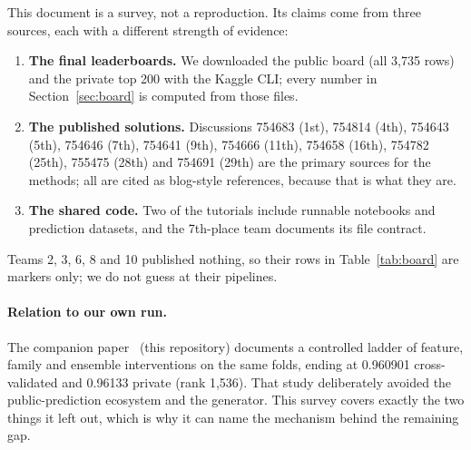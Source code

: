 \documentclass[10pt,a4paper]{article}
\begin{document}
This document is a survey, not a reproduction. Its claims come from three sources, each
with a different strength of evidence:
\begin{enumerate}
  \item \textbf{The final leaderboards.} We downloaded the public board (all 3{,}735 rows)
        and the private top 200 with the Kaggle CLI; every number in
        Section~\ref{sec:board} is computed from those files.
  \item \textbf{The published solutions.} Discussions 754683 (1st), 754814 (4th),
        754643 (5th), 754646 (7th), 754641 (9th), 754666 (11th), 754658 (16th),
        754782 (25th), 755475 (28th) and 754691 (29th) are the primary sources for the
        methods; all are cited as blog-style references, because that is what they are.
  \item \textbf{The shared code.} Two of the tutorials include runnable notebooks and
        prediction datasets, and the 7th-place team documents its file contract.
\end{enumerate}
Teams 2, 3, 6, 8 and 10 published nothing, so their rows in Table~\ref{tab:board} are
markers only; we do not guess at their pipelines.

\paragraph{Relation to our own run.}
The companion paper~\citep{kaggle_s6e10} (this repository) documents a controlled ladder of
feature, family and ensemble interventions on the same folds, ending at 0.960901
cross-validated and 0.96133 private (rank 1{,}536). That study deliberately avoided the
public-prediction ecosystem and the generator. This survey covers exactly the two things it
left out, which is why it can name the mechanism behind the remaining gap.







\end{document}
